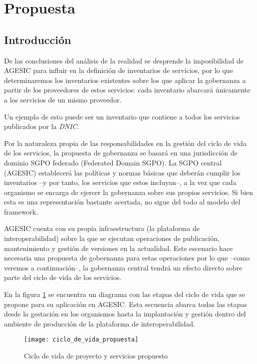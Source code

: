 \documentclass[11pt]{article}
\begin{document}
	\section{Propuesta}
		\subsection{Introducción}
			De las conclusiones del análisis de la realidad se desprende la imposibilidad de AGESIC para influir en la definición de inventarios de servicios, por lo que determinaremos los inventarios existentes sobre los que aplicar la gobernanza a partir de los proveedores de estos servicios: cada inventario abarcará únicamente a los servicios de un mismo proveedor.

			Un ejemplo de esto puede ser un inventario que contiene a todos los servicios publicados por la \emph{DNIC}.

			Por la naturaleza propia de las responsabilidades en la gestión del ciclo de vida de los servicios, la propuesta de gobernanza se basará en una jurisdicción de dominio SGPO federado (Federated Domain SGPO). La SGPO central (AGESIC) establecerá las políticas y normas básicas que deberán cumplir los inventarios –y por tanto, los servicios que estos incluyan–, a la vez que cada organismo se encarga de ejercer la gobernanza sobre sus propios servicios. Si bien esta es una representación bastante acertada, no sigue del todo al modelo del framework.

			AGESIC cuenta con su propia infraestructura (la plataforma de interoperabilidad) sobre la que se ejecutan operaciones de publicación, mantenimiento y gestión de versiones en la actualidad. Este escenario hace necesaria una propuesta de gobernanza para estas operaciones por lo que –como veremos a continuación–, la gobernanza central tendrá un efecto directo sobre parte del ciclo de vida de los servicios.

			En la figura \ref{figura:ciclo_de_vida_propuesta} se encuentra un diagrama con las etapas del ciclo de vida que se propone para su aplicación en AGESIC. Esta secuencia abarca todas las etapas desde la gestación en los organismos hasta la implantación y gestión dentro del ambiente de producción de la plataforma de interoperabilidad.

			\begin{figure}[h]
			    \centering
			    \texttt{[image: ciclo\_de\_vida\_propuesta]}
			    \caption{Ciclo de vida de proyecto y servicios propuesto}
			    \label{figura:ciclo_de_vida_propuesta}
			\end{figure}
\end{document}
